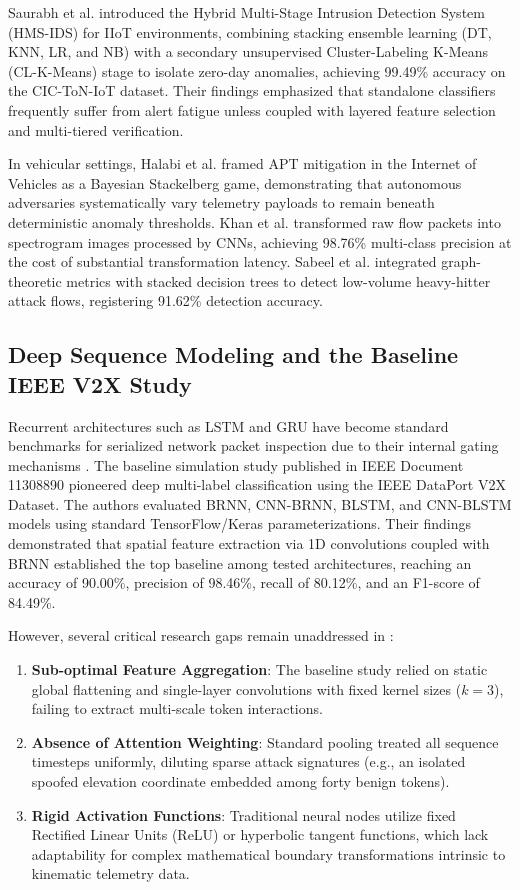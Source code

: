 \documentclass[conference]{IEEEtran}
\begin{document}
Saurabh et al. \cite{saurabh2024hmsids} introduced the Hybrid Multi-Stage Intrusion Detection System (HMS-IDS) for IIoT environments, combining stacking ensemble learning (DT, KNN, LR, and NB) with a secondary unsupervised Cluster-Labeling K-Means (CL-K-Means) stage to isolate zero-day anomalies, achieving 99.49\% accuracy on the CIC-ToN-IoT dataset. Their findings emphasized that standalone classifiers frequently suffer from alert fatigue unless coupled with layered feature selection and multi-tiered verification.

In vehicular settings, Halabi et al. \cite{halabi2021protecting} framed APT mitigation in the Internet of Vehicles as a Bayesian Stackelberg game, demonstrating that autonomous adversaries systematically vary telemetry payloads to remain beneath deterministic anomaly thresholds. Khan et al. \cite{khan2021spectrogram} transformed raw flow packets into spectrogram images processed by CNNs, achieving 98.76\% multi-class precision at the cost of substantial transformation latency. Sabeel et al. \cite{sabeel2021building} integrated graph-theoretic metrics with stacked decision trees to detect low-volume heavy-hitter attack flows, registering 91.62\% detection accuracy.

\subsection{Deep Sequence Modeling and the Baseline IEEE V2X Study}
Recurrent architectures such as LSTM and GRU have become standard benchmarks for serialized network packet inspection due to their internal gating mechanisms \cite{singh2023hyperparameter, zahoor2022zero}. The baseline simulation study published in IEEE Document 11308890 \cite{ieee11308890} pioneered deep multi-label classification using the IEEE DataPort V2X Dataset. The authors evaluated BRNN, CNN-BRNN, BLSTM, and CNN-BLSTM models using standard TensorFlow/Keras parameterizations. Their findings demonstrated that spatial feature extraction via 1D convolutions coupled with BRNN established the top baseline among tested architectures, reaching an accuracy of 90.00\%, precision of 98.46\%, recall of 80.12\%, and an F1-score of 84.49\%.

However, several critical research gaps remain unaddressed in \cite{ieee11308890}:
\begin{enumerate}
    \item \textbf{Sub-optimal Feature Aggregation}: The baseline study relied on static global flattening and single-layer convolutions with fixed kernel sizes ($k=3$), failing to extract multi-scale token interactions.
    \item \textbf{Absence of Attention Weighting}: Standard pooling treated all sequence timesteps uniformly, diluting sparse attack signatures (e.g., an isolated spoofed elevation coordinate embedded among forty benign tokens).
    \item \textbf{Rigid Activation Functions}: Traditional neural nodes utilize fixed Rectified Linear Units (ReLU) or hyperbolic tangent functions, which lack adaptability for complex mathematical boundary transformations intrinsic to kinematic telemetry data.
\end{enumerate}
\end{document}

